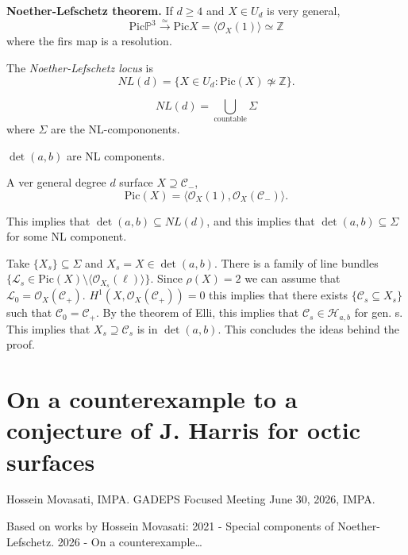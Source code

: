 \medskip\noindent
{\bf Noether-Lefschetz theorem.} 
If $d \geq  4$ and $X \in U_d$
is very general,
$$
\text{Pic}\mathbb{P}^3
\xrightarrow{\simeq}
\text{Pic}X 
=
\langle \mathcal{O}_X(1)\rangle
\simeq \mathbb{Z}
$$
where the firs map is a resolution.

\begin{definition}
\label{definition-nl-locus}
The {\it Noether-Lefschetz locus} is
$$
NL(d)
=
\{ X \in U_d: \text{Pic}(X)\not\simeq
\mathbb{Z}\}.
$$
\end{definition}

\noindent
$$
NL(d) = \bigcup_{\operatorname{countable}}
\Sigma
$$
where $\Sigma$ are the NL-compononents.

\begin{theorem}[L,LH,V 24]
\label{theorem-llhv24ii}
$\det(a,b)$ are NL components.
\end{theorem}

\begin{theorem}[Lopez, 91]
\label{theorem-lopez-91}
A ver general degree $d$ surface
$X \supseteq \mathcal{C}_-$,
$$
\text{Pic}(X) = 
\langle \mathcal{O}_X(1),
\mathcal{O}_X(\mathcal{C}_-)\rangle.
$$
\end{theorem}

\noindent
This implies that $\det(a,b) \subseteq
NL(d)$,
and this implies that
$\det(a,b) \subseteq \Sigma$ for some
NL component.

Take $\{ X_s\} \subseteq \Sigma$
and $X_s = X \in \det(a,b)$.
There is a family of line bundles
$\{\mathcal{L}_s \in \text{Pic}(X)\setminus
\langle\mathcal{O}_{X_s}(\ell)\rangle\}$.
Since $\rho(X) = 2$ we can assume that
$\mathcal{L}_0 =
\mathcal{O}_X(\mathcal{C}_+)$.
$H^1(X,\mathcal{O}_X(\mathcal{C}_+))=0$
this implies that there exists
$\{\mathcal{C}_s \subseteq X_s\}$ such that
$\mathcal{C}_0 = \mathcal{C}_{+}$.
By the theorem of Elli, this implies that
$\mathcal{C}_s \in \mathcal{H}_{a,b}$ for
gen. s. This implies that
$X_s \supseteq \mathcal{C}_s$ is in 
$\det(a,b)$. This concludes the ideas
behind the proof.

\section{On a counterexample to a conjecture
of J. Harris for octic surfaces}
\label{section-counterexample-harris-conj}

\noindent
Hossein Movasati, IMPA.
GADEPS Focused Meeting June 30, 2026, IMPA.

\medskip\noindent
Based on works by Hossein Movasati:
2021 - Special components of
Noether-Lefschetz. 2026 - On a
counterexample…

